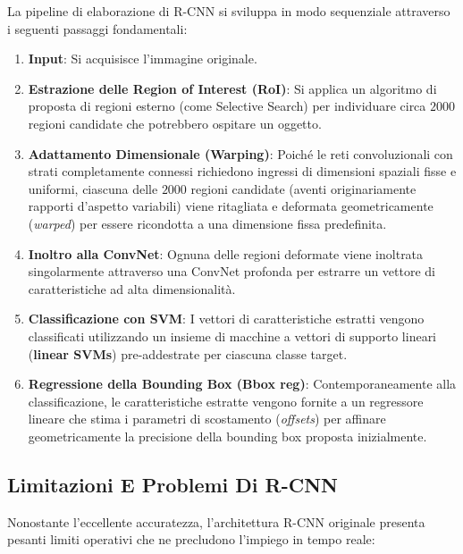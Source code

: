 ﻿\documentclass[11pt, a4paper]{article}
\begin{document}
La pipeline di elaborazione di R-CNN si sviluppa in modo sequenziale attraverso i seguenti passaggi fondamentali:
\begin{enumerate}[noitemsep]
    \item \textbf{Input}: Si acquisisce l'immagine originale.
    \item \textbf{Estrazione delle Region of Interest (RoI)}: Si applica un algoritmo di proposta di regioni esterno (come Selective Search) per individuare circa $2000$ regioni candidate che potrebbero ospitare un oggetto.
    \item \textbf{Adattamento Dimensionale (Warping)}: Poiché le reti convoluzionali con strati completamente connessi richiedono ingressi di dimensioni spaziali fisse e uniformi, ciascuna delle $2000$ regioni candidate (aventi originariamente rapporti d'aspetto variabili) viene ritagliata e deformata geometricamente (\emph{warped}) per essere ricondotta a una dimensione fissa predefinita.
    \item \textbf{Inoltro alla ConvNet}: Ognuna delle regioni deformate viene inoltrata singolarmente attraverso una ConvNet profonda per estrarre un vettore di caratteristiche ad alta dimensionalità.
    \item \textbf{Classificazione con SVM}: I vettori di caratteristiche estratti vengono classificati utilizzando un insieme di macchine a vettori di supporto lineari (\textbf{linear SVMs}) pre-addestrate per ciascuna classe target.
    \item \textbf{Regressione della Bounding Box (Bbox reg)}: Contemporaneamente alla classificazione, le caratteristiche estratte vengono fornite a un regressore lineare che stima i parametri di scostamento (\emph{offsets}) per affinare geometricamente la precisione della bounding box proposta inizialmente.
\end{enumerate}

\newpage

\subsection{Limitazioni E Problemi Di R-CNN}

Nonostante l'eccellente accuratezza, l'architettura R-CNN originale presenta pesanti limiti operativi che ne precludono l'impiego in tempo reale:

\end{document}
